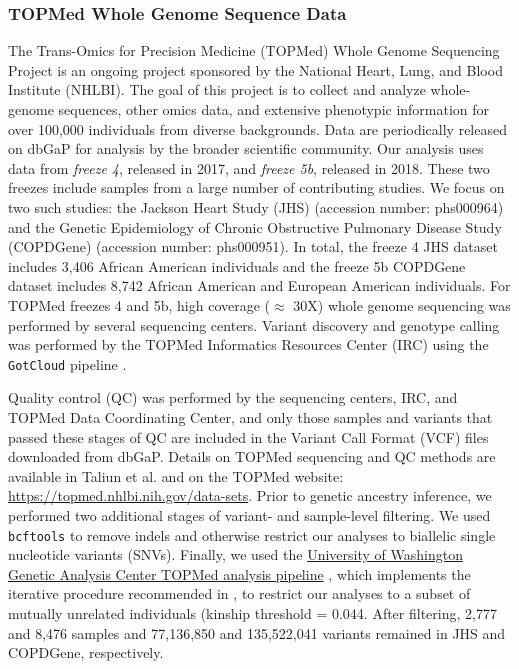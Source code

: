 \documentclass[12pt]{article}
\newcommand{\edit}[1]{{\color{red}{#1}}}
\begin{document}
\subsubsection{TOPMed Whole Genome Sequence Data}

The Trans-Omics for Precision Medicine (TOPMed) Whole Genome Sequencing Project is an ongoing project sponsored by the National Heart, Lung, and Blood Institute (NHLBI).
The goal of this project is to collect and analyze whole-genome sequences, other omics data, and extensive phenotypic information for over 100,000 individuals from diverse backgrounds. 
Data are periodically released on dbGaP for analysis by the broader scientific community. 
Our analysis uses data from \textit{freeze 4}, released in 2017, and \textit{freeze 5b}, released in 2018.
These two freezes include samples from a large number of contributing studies.
We focus on two such studies: the Jackson Heart Study (JHS) (accession number: phs000964) and the Genetic Epidemiology of Chronic Obstructive Pulmonary Disease Study (COPDGene) (accession number: phs000951).
In total, the freeze 4 JHS dataset includes 3,406 African American individuals and the freeze 5b COPDGene dataset includes 8,742 African American and European American individuals.
For TOPMed freezes 4 and 5b, high coverage ($\approx$ 30X) whole genome sequencing was performed by several sequencing centers.
Variant discovery and genotype calling was performed by the TOPMed Informatics Resources Center (IRC) using the \texttt{GotCloud} pipeline \citep{jun2015}.

Quality control (QC) was performed by the sequencing centers, IRC, and TOPMed Data Coordinating Center, and only those samples and variants that passed these stages of QC are included in the Variant Call Format (VCF) files downloaded from dbGaP.
Details on TOPMed sequencing and QC methods are available in Taliun et al. \citep{taliun2021} and on the TOPMed website: \href{https://topmed.nhlbi.nih.gov/data-sets}{https://topmed.nhlbi.nih.gov/data-sets}.
Prior to genetic ancestry inference, we performed two additional stages of variant- and sample-level filtering.
We used \texttt{bcftools} \citep{bcftools} to remove indels and otherwise restrict our analyses to biallelic single nucleotide variants (SNVs). 
Finally, we used the \href{https://github.com/UW-GAC/analysis_pipeline}{University of Washington Genetic Analysis Center TOPMed analysis pipeline} \citep{GACpipeline}, which implements the iterative procedure recommended in \cite{conomos2016related}, to restrict our analyses to a subset of mutually unrelated individuals (kinship threshold = 0.044. 
After filtering, 2,777 and 8,476 samples and 77,136,850 and 135,522,041 variants remained in JHS and COPDGene, respectively.
\end{document}
